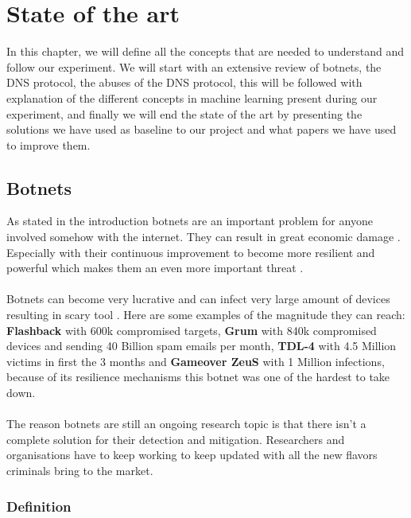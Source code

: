
\chapter{State of the art}

\label{State of the art}

In this chapter, we will define all the concepts that are needed to understand and follow our experiment. We will start with an extensive review of botnets, the DNS protocol, the abuses of the DNS protocol, this will be followed with explanation of the different concepts in machine learning present during our experiment, and finally we will end the state of the art by presenting the solutions we have used as baseline to our project and what papers we have used to improve them. 
\section{Botnets}
As stated in the introduction botnets are an important problem for anyone involved somehow with the internet. They can result in great economic damage \cite{survey1}\cite{survey2}.
Especially with their continuous improvement to become more resilient and powerful which makes them an even more important threat \cite{report1}.\\
\\
Botnets can become very lucrative and can infect very large amount of devices resulting in scary tool \cite{pheonix}. Here are some examples of the magnitude they can reach: \textbf{Flashback} with 600k compromised targets, \textbf{Grum} with 840k compromised devices and sending 40 Billion spam emails per month, \textbf{TDL-4} with 4.5 Million victims in first the 3 months and \textbf{Gameover ZeuS} with 1 Million infections, because of its resilience mechanisms this botnet was one of the hardest to take down.\\
\\
The reason botnets are still an ongoing research topic is that there isn't a complete solution for their detection and mitigation. Researchers and organisations have to keep working to keep updated with all the new flavors criminals bring to the market\cite{survey2}.
\subsection{Definition}
